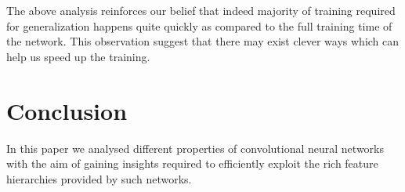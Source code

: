 \documentclass[runningheads]{llncs}
\begin{document}
\setlength{\tabcolsep}{1pt}
\begin{table}[t!]
\begin{center}
\caption{Performance of 50-50 network for detection on pascal-voc-2007 challenge. (l5 is pool-5 and l7 is relu-7)}
\label{table:det-trajectory}
\end{center}
\end{table}
\setlength{\tabcolsep}{1.4pt}
The above analysis reinforces our belief that indeed majority of training required for generalization happens quite quickly as compared to the full training time of the network. This observation suggest that there may exist clever ways which can help us speed up the training.
\section{Conclusion}
\label{sec:conclusion}
In this paper we analysed different properties of convolutional neural networks with the aim of gaining insights required to efficiently exploit the rich feature hierarchies provided by such networks.



\end{document}
